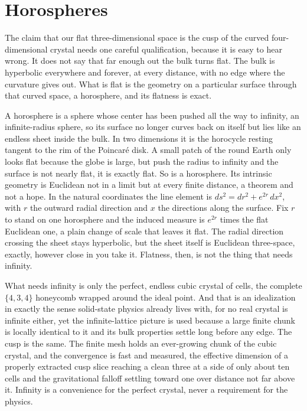 \section{Horospheres}

The claim that our flat three-dimensional space is the cusp of the curved four-dimensional crystal needs one careful qualification, because it is easy to hear wrong. It does not say that far enough out the bulk turns flat. The bulk is hyperbolic everywhere and forever, at every distance, with no edge where the curvature gives out. What is flat is the geometry on a particular surface through that curved space, a horosphere, and its flatness is exact.

A horosphere is a sphere whose center has been pushed all the way to infinity, an infinite-radius sphere, so its surface no longer curves back on itself but lies like an endless sheet inside the bulk. In two dimensions it is the horocycle resting tangent to the rim of the Poincar\'e disk. A small patch of the round Earth only looks flat because the globe is large, but push the radius to infinity and the surface is not nearly flat, it is exactly flat. So is a horosphere. Its intrinsic geometry is Euclidean not in a limit but at every finite distance, a theorem and not a hope. In the natural coordinates the line element is $ds^2 = dr^2 + e^{2r}\,dx^2$, with $r$ the outward radial direction and $x$ the directions along the surface. Fix $r$ to stand on one horosphere and the induced measure is $e^{2r}$ times the flat Euclidean one, a plain change of scale that leaves it flat. The radial direction crossing the sheet stays hyperbolic, but the sheet itself is Euclidean three-space, exactly, however close in you take it. Flatness, then, is not the thing that needs infinity.

What needs infinity is only the perfect, endless cubic crystal of cells, the complete $\{4,3,4\}$ honeycomb wrapped around the ideal point. And that is an idealization in exactly the sense solid-state physics already lives with, for no real crystal is infinite either, yet the infinite-lattice picture is used because a large finite chunk is locally identical to it and its bulk properties settle long before any edge. The cusp is the same. The finite mesh holds an ever-growing chunk of the cubic crystal, and the convergence is fast and measured, the effective dimension of a properly extracted cusp slice reaching a clean three at a side of only about ten cells and the gravitational falloff settling toward one over distance not far above it. Infinity is a convenience for the perfect crystal, never a requirement for the physics.


